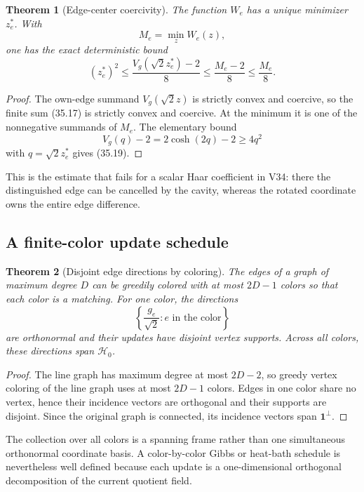 \documentclass[11pt]{article}
\newtheorem{theorem}{Theorem}[section]
\theoremstyle{remark}
\begin{document}
\begin{theorem}[Edge-center coercivity]
\label{thm:v17v35-center}
The function \(W_e\) has a unique minimizer \(z_e^*\).  With
\[
 M_e=\min_zW_e(z),                                 \tag{35.18}
\]
one has the exact deterministic bound
\[
 \boxed{
 (z_e^*)^2
 \leq\frac{V_g(\sqrt2z_e^*)-2}{8}
 \leq\frac{M_e-2}{8}
 \leq\frac{M_e}{8}.}                              \tag{35.19}
\]
\end{theorem}

\begin{proof}
The own-edge summand \(V_g(\sqrt2z)\) is strictly convex and coercive,
so the finite sum (35.17) is strictly convex and coercive.  At the
minimum it is one of the nonnegative summands of \(M_e\).  The elementary
bound
\[
 V_g(q)-2=2\cosh(2q)-2\geq4q^2                    \tag{35.20}
\]
with \(q=\sqrt2z_e^*\) gives (35.19).
\end{proof}

This is the estimate that fails for a scalar Haar coefficient in V34:
there the distinguished edge can be cancelled by the cavity, whereas
the rotated coordinate owns the entire edge difference.

\subsection{A finite-color update schedule}

\begin{theorem}[Disjoint edge directions by coloring]
\label{thm:v17v35-color}
The edges of a graph of maximum degree \(D\) can be greedily colored
with at most \(2D-1\) colors so that each color is a matching.  For one
color, the directions
\[
 \left\{\frac{g_e}{\sqrt2}:e\text{ in the color}\right\}        \tag{35.21}
\]
are orthonormal and their updates have disjoint vertex supports.  Across
all colors, these directions span \(\mathcal H_0\).
\end{theorem}

\begin{proof}
The line graph has maximum degree at most \(2D-2\), so greedy vertex
coloring of the line graph uses at most \(2D-1\) colors.  Edges in one
color share no vertex, hence their incidence vectors are orthogonal and
their supports are disjoint.  Since the original graph is connected,
its incidence vectors span \(\mathbf1^\perp\).
\end{proof}

The collection over all colors is a spanning frame rather than one
simultaneous orthonormal coordinate basis.  A color-by-color Gibbs or
heat-bath schedule is nevertheless well defined because each update is
a one-dimensional orthogonal decomposition of the current quotient
field.
\end{document}
